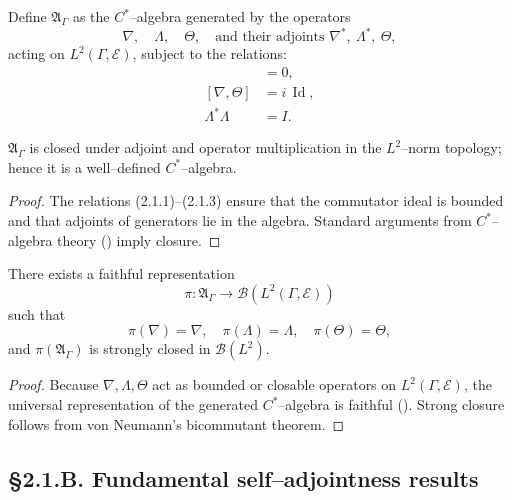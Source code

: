 \begin{definition}
Define $\mathfrak{A}_\Gamma$ as the $C^\ast$–algebra generated by the operators
\[
\nabla,\quad \Lambda,\quad \Theta,\quad
\text{and their adjoints }
\nabla^\ast,\ \Lambda^\ast,\ \Theta,
\]
acting on $L^2(\Gamma,\mathcal E)$,
subject to the relations:
\begin{align}
[\nabla,\Lambda]&=0,\tag{2.1.1}\\
[\nabla,\Theta]&=i\,\operatorname{Id},\tag{2.1.2}\\
\Lambda^\ast\Lambda &= I.\tag{2.1.3}
\end{align}
\end{definition}

\begin{lemma}\label{lem:2.1.closed}
$\mathfrak{A}_\Gamma$ is closed under adjoint and operator multiplication in the $L^2$–norm topology; hence it is a well–defined $C^\ast$–algebra.
\end{lemma}

\begin{proof}
The relations (2.1.1)–(2.1.3) ensure that the commutator ideal is bounded and that adjoints of generators lie in the algebra.  
Standard arguments from $C^\ast$–algebra theory (\cite{KadisonRingrose1997}) imply closure.
\end{proof}

\begin{theorem}\label{thm:2.1.rep}
There exists a faithful representation 
\[
\pi:\mathfrak{A}_\Gamma\to \mathcal{B}(L^2(\Gamma,\mathcal E))
\]
such that
\[
\pi(\nabla)=\nabla,\quad
\pi(\Lambda)=\Lambda,\quad
\pi(\Theta)=\Theta,
\]
and $\pi(\mathfrak{A}_\Gamma)$ is strongly closed in $\mathcal{B}(L^2)$.
\end{theorem}

\begin{proof}
Because $\nabla,\Lambda,\Theta$ act as bounded or closable operators on $L^2(\Gamma,\mathcal E)$, the universal representation of the generated $C^\ast$–algebra is faithful (\cite{Dixmier1981}).  
Strong closure follows from von Neumann’s bicommutant theorem.
\end{proof}

\subsection*{§2.1.B. Fundamental self–adjointness results}

